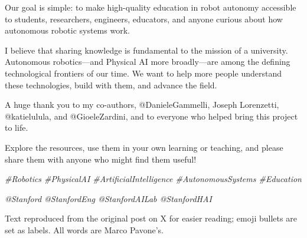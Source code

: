 \documentclass[11pt]{article}
\begin{document}
Our goal is simple: to make high-quality education in robot autonomy accessible to students, researchers, engineers, educators, and anyone curious about how autonomous robotic systems work.

I believe that sharing knowledge is fundamental to the mission of a university. Autonomous robotics---and Physical AI more broadly---are among the defining technological frontiers of our time. We want to help more people understand these technologies, build with them, and advance the field.

A huge thank you to my co-authors, @DanieleGammelli, Joseph Lorenzetti, @katielulula, and @GioeleZardini, and to everyone who helped bring this project to life.

Explore the resources, use them in your own learning or teaching, and please share them with anyone who might find them useful!

\textit{\#Robotics \#PhysicalAI \#ArtificialIntelligence \#AutonomousSystems \#Education}

\textit{@Stanford @StanfordEng @StanfordAILab @StanfordHAI}

\vfill
\begin{center}\footnotesize
Text reproduced from the original post on X for easier reading; emoji bullets are set as labels. All words are Marco Pavone's.
\end{center}
\end{document}
